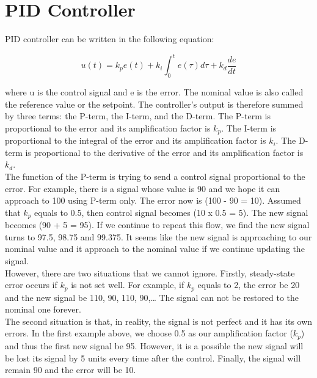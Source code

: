 \section{PID Controller} %
PID controller can be written in the following equation:

\begin{equation} \label{eq3}
u(t) = k_p e(t) + k_i \int_{0}^{t} e(\tau) d\tau + k_d \frac{d e}{d t}
\end{equation}

 where u is the control signal and e is the error. The nominal value is also called the reference value or the setpoint. The controller’s output is therefore summed by three terms: the P-term, the I-term, and the D-term. The P-term is proportional to the error and its amplification factor is $k_p$. The I-term is proportional to the integral of the error and its amplification factor is $k_i$. The D-term is proportional to the derivative of the error and its amplification factor is $k_d$.\\
 
 The function of the P-term is trying to send a control signal proportional to the error. For example, there is a signal whose value is 90 and we hope it can approach to 100 using P-term only. The error now is (100 - 90 = 10). Assumed that $k_p$ equals to 0.5, then control signal becomes (10 x 0.5 = 5). The new signal becomes (90 + 5 = 95). If we continue to repeat this flow, we find the new signal turns to 97.5, 98.75 and 99.375. It seems like the new signal is approaching to our nominal value and it approach to the nominal value if we continue updating the signal.\\
 

However, there are two situations that we cannot ignore. Firstly, steady-state error occurs if $k_p$ is not set well. For example, if $k_p$ equals to 2, the error be 20 and the new signal be 110, 90, 110, 90,… The signal can not be restored to the nominal one forever. \\

The second situation is that, in reality, the signal is not perfect and it has its own errors. In the first example above, we choose 0.5 as our amplification factor ($k_p$) and thus the first new signal be 95. However, it is a possible the new signal will be lost its signal by 5 units every time after the control. Finally, the signal will remain 90 and the error will be 10. \\

